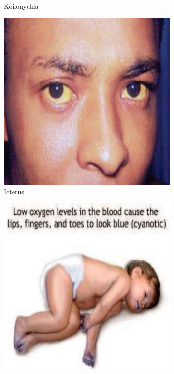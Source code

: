 \documentclass[a4paper,12pt]{book}
\begin{document}
{\begin{figure}[h]
\begin{subfigure}[t]{.23\textwidth}
																	\caption{Koilonychia}
																	\label{koilonychia}
																\end{subfigure}
																\hspace{\fill}
																\begin{subfigure}[t]{.23\textwidth}
																	\centering
																	\includegraphics[width=\textwidth]{./clinicalPhysioPic/jaundice.jpg}
																	\caption{Icterus}
																	\label{icterus}
																\end{subfigure}
																\hspace{\fill}
																\begin{subfigure}[t]{.23\textwidth}
																	\centering
																	\includegraphics[width=\textwidth]{./clinicalPhysioPic/cyanosis4-0.jpg}

\end{subfigure}
\end{figure}}
\end{document}
